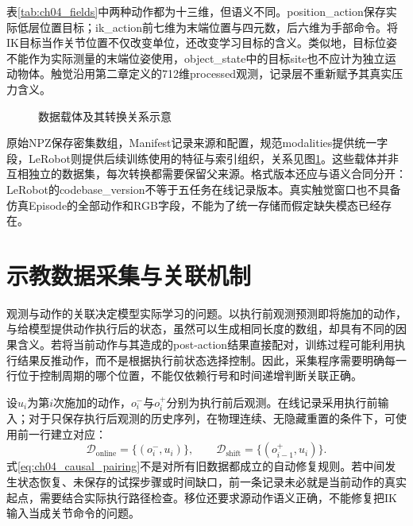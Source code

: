 表\ref{tab:ch04_fields}中两种动作都为十三维，但语义不同。position\_action保存实际低层位置目标；ik\_action前七维为末端位置与四元数，后六维为手部命令。将IK目标当作关节位置不仅改变单位，还改变学习目标的含义。类似地，目标位姿不能作为实际测量的末端位姿使用，object\_state中的目标site也不应计为独立运动物体。触觉沿用第二章定义的712维processed观测，记录层不重新赋予其真实压力含义。

\begin{figure}[htbp]
 \centering
 \caption{数据载体及其转换关系示意}
 \label{fig:ch04_carriers}
\end{figure}

原始NPZ保存密集数组，Manifest记录来源和配置，规范modalities提供统一字段，LeRobot则提供后续训练使用的特征与索引组织，关系见图\ref{fig:ch04_carriers}。这些载体并非互相独立的数据集，每次转换都需要保留父来源。格式版本还应与语义合同分开：LeRobot的codebase\_version不等于五任务在线记录版本。真实触觉窗口也不具备仿真Episode的全部动作和RGB字段，不能为了统一存储而假定缺失模态已经存在。

\section{示教数据采集与关联机制}
\label{sec:data_recording_alignment}

观测与动作的关联决定模型实际学习的问题。以执行前观测预测即将施加的动作，与给模型提供动作执行后的状态，虽然可以生成相同长度的数组，却具有不同的因果含义。若将当前动作与其造成的post-action结果直接配对，训练过程可能利用执行结果反推动作，而不是根据执行前状态选择控制。因此，采集程序需要明确每一行位于控制周期的哪个位置，不能仅依赖行号和时间递增判断关联正确。

设$u_i$为第$i$次施加的动作，$o_i^{-}$与$o_i^{+}$分别为执行前后观测。在线记录采用执行前输入；对于只保存执行后观测的历史序列，在物理连续、无隐藏重置的条件下，可使用前一行建立对应：
\begin{equation}
 \mathcal D_{\mathrm{online}}=\{(o_i^{-},u_i)\},\qquad
 \mathcal D_{\mathrm{shift}}=\{(o_{i-1}^{+},u_i)\}.
 \label{eq:ch04_causal_pairing}
\end{equation}
式\ref{eq:ch04_causal_pairing}不是对所有旧数据都成立的自动修复规则。若中间发生状态恢复、未保存的试探步骤或时间缺口，前一条记录未必就是当前动作的真实起点，需要结合实际执行路径检查。移位还要求源动作语义正确，不能修复把IK输入当成关节命令的问题。

